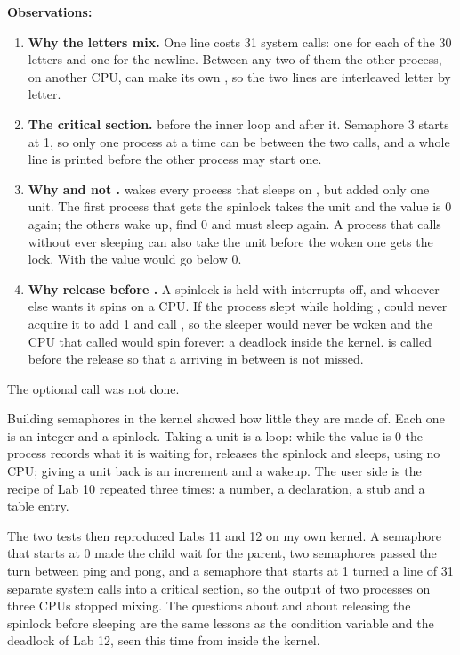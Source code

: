 \documentclass[11pt,a4paper]{article}
\begin{document}
\textbf{Observations:}
\begin{enumerate}
  \item \textbf{Why the letters mix.} One line costs 31 system calls: one  for
  each of the 30 letters and one for the newline. Between any two of them the other process, on
  another CPU, can make its own , so the two lines are interleaved letter by
  letter.
  \item \textbf{The critical section.}  before the inner loop and
   after it. Semaphore 3 starts at 1, so only one process at a time can be
  between the two calls, and a whole line is printed before the other process may start one.
  \item \textbf{Why  and not .}  wakes every process that
  sleeps on , but  added only one unit. The first process that gets the
  spinlock takes the unit and the value is 0 again; the others wake up, find 0 and must sleep
  again. A process that calls  without ever sleeping can also take the unit
  before the woken one gets the lock. With  the value would go below 0.
  \item \textbf{Why release before .} A spinlock is held with interrupts off, and
  whoever else wants it spins on a CPU. If the process slept while holding ,
   could never acquire it to add 1 and call , so the sleeper would
  never be woken and the CPU that called  would spin forever: a deadlock inside
  the kernel.  is called before the release so that a 
  arriving in between is not missed.
\end{enumerate}

The optional  call was not done.


Building semaphores in the kernel showed how little they are made of. Each one is an integer
and a spinlock. Taking a unit is a loop: while the value is 0 the process records what it is
waiting for, releases the spinlock and sleeps, using no CPU; giving a unit back is an increment
and a wakeup. The user side is the recipe of Lab 10 repeated three times: a number, a
declaration, a stub and a table entry.

The two tests then reproduced Labs 11 and 12 on my own kernel. A semaphore that starts at 0
made the child wait for the parent, two semaphores passed the turn between ping and pong, and
a semaphore that starts at 1 turned a line of 31 separate system calls into a critical section,
so the output of two processes on three CPUs stopped mixing. The questions about 
and about releasing the spinlock before sleeping are the same lessons as the condition variable
and the deadlock of Lab 12, seen this time from inside the kernel.
\end{document}

